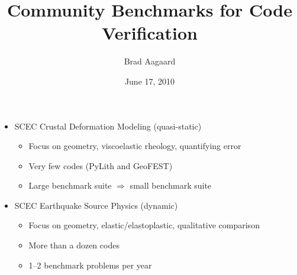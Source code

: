 \documentclass[pdftex,cig,slideColor]{pp4slides}
\title{Community Benchmarks for Code Verification}
\author{Brad Aagaard}
\date{June 17, 2010}
\begin{document}
\maketitle

  \summary{}

 \begin{itemize}
 \item SCEC Crustal Deformation Modeling (quasi-static)
   \begin{itemize}
   \item Focus on geometry, viscoelastic rheology, quantifying error
   \item Very few codes (PyLith and GeoFEST)
   \item Large benchmark suite $\Rightarrow$ small benchmark suite
   \end{itemize}
 \item SCEC Earthquake Source Physics (dynamic)
    \begin{itemize}
    \item Focus on geometry, elastic/elastoplastic, qualitative
      comparison
    \item More than a dozen codes
    \item 1--2 benchmark problems per year
    \end{itemize}
  \end{itemize}



  \summary{}
\end{document}
